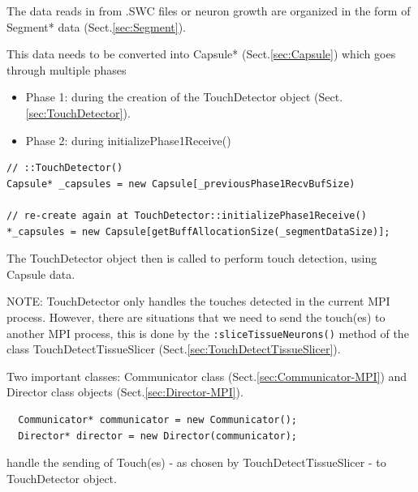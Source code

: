 The data reads in from .SWC files or neuron growth are organized in the form of
Segment* data (Sect.\ref{sec:Segment}). 

This data needs to be converted into Capsule* (Sect.\ref{sec:Capsule})
which goes through multiple phases
\begin{itemize}
  \item Phase 1: during the creation of the TouchDetector object
  (Sect.\ref{sec:TouchDetector}).
  
  \item Phase 2: during initializePhase1Receive()
\end{itemize}

\begin{verbatim}
// ::TouchDetector()
Capsule* _capsules = new Capsule[_previousPhase1RecvBufSize)

// re-create again at TouchDetector::initializePhase1Receive()
*_capsules = new Capsule[getBuffAllocationSize(_segmentDataSize)];

\end{verbatim}

The TouchDetector object then is called to perform touch detection, using
Capsule data.

NOTE: TouchDetector only handles the touches detected in the current MPI
process. However, there are situations that we need to send the touch(es) to
another MPI process, this is done by the \verb!:sliceTissueNeurons()!
method of the class TouchDetectTissueSlicer
(Sect.\ref{sec:TouchDetectTissueSlicer}).

Two important classes: Communicator class (Sect.\ref{sec:Communicator-MPI}) and
Director class objects (Sect.\ref{sec:Director-MPI}).
\begin{verbatim}
  Communicator* communicator = new Communicator();
  Director* director = new Director(communicator);
\end{verbatim}
handle the sending of Touch(es) - as chosen by TouchDetectTissueSlicer - to
TouchDetector object.


